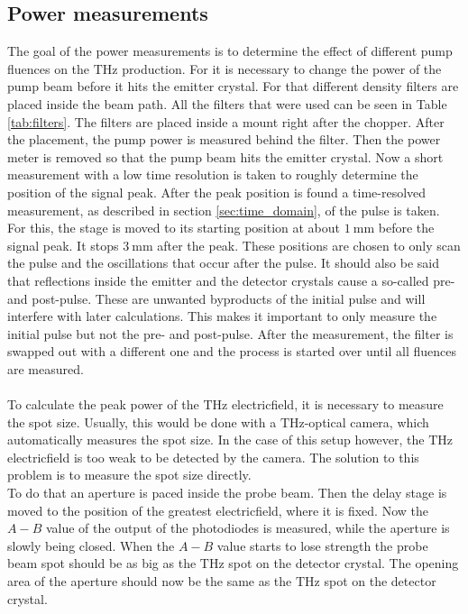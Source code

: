 \subsection{Power measurements}
\label{sec:power}
The goal of the power measurements is to determine the effect of different pump fluences on the $\si{\tera\hertz}$ production.
For it is necessary to change the power of the pump beam before it hits the emitter crystal.
For that different density filters are placed inside the beam path.
All the filters that were used can be seen in Table \ref{tab:filters}.
The filters are placed inside a mount right after the chopper.
After the placement, the pump power is measured behind the filter.
Then the power meter is removed so that the pump beam hits the emitter crystal.
Now a short measurement with a low time resolution is taken to roughly determine the position of the signal peak.
After the peak position is found a time-resolved measurement, as described in section \ref{sec:time_domain}, of the pulse is taken.
For this, the stage is moved to its starting position at about $\SI{1}{\milli\meter}$ before the signal peak.
It stops $\SI{3}{\milli\meter}$ after the peak.
These positions are chosen to only scan the pulse and the oscillations that occur after the pulse.
It should also be said that reflections inside the emitter and the detector crystals cause a so-called pre- and post-pulse.
These are unwanted byproducts of the initial pulse and will interfere with later calculations.
This makes it important to only measure the initial pulse but not the pre- and post-pulse.
After the measurement, the filter is swapped out with a different one and the process is started over until all fluences are measured.
\\\\
To calculate the peak power of the $\si{\tera\hertz}$ electricfield, it is necessary to measure the spot size.
Usually, this would be done with a $\si{\tera\hertz}$-optical camera, which automatically measures the spot size.
In the case of this setup however, the $\si{\tera\hertz}$ electricfield is too weak to be detected by the camera.
The solution to this problem is to measure the spot size directly.
\\
To do that an aperture is paced inside the probe beam.
Then the delay stage is moved to the position of the greatest electricfield, where it is fixed.
Now the $A-B$ value of the  output of the photodiodes is measured, while the aperture is slowly being closed.
When the $A-B$ value starts to lose strength the probe beam spot should be as big as the $\si{\tera\hertz}$ spot on the detector crystal.
The opening area of the aperture should now be the same as the $\si{\tera\hertz}$ spot on the detector crystal.
